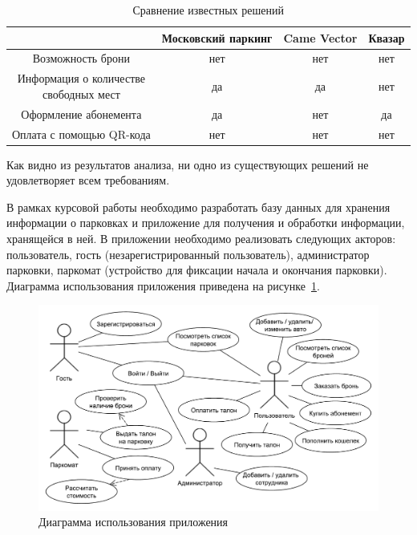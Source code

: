 \renewcommand{\thetable}{\thesubsection.\arabic{table}}
\begin{table}[H]
	\begin{center}
		\begin{center}
			\caption{\label{tab:existing_decision}Сравнение известных решений}
		\end{center}
		\begin{tabular}{|c|c|c|c|}
			\hline 
			~ & Московский паркинг & Came Vector & Квазар \\ \hline
        Возможность брони & нет & нет & нет \\ \hline
        \specialcell{Информация о количестве \\ свободных мест} & да & да & нет \\ \hline
        Оформление абонемента & да & нет & да \\ \hline
        Оплата с помощью QR-кода & нет & нет & нет \\ \hline
		\end{tabular}
	\end{center}
\end{table}
Как видно из результатов анализа, ни одно из существующих решений не удовлетворяет всем требованиям.

В рамках курсовой работы необходимо разработать базу данных для хранения информации о парковках и приложение для получения и обработки информации, хранящейся в ней.
В приложении необходимо реализовать следующих акторов: пользователь, гость (незарегистрированный пользователь), администратор парковки, паркомат (устройство для фиксации начала и окончания парковки).
Диаграмма использования приложения приведена на рисунке~\ref{fig:use_case}.
\renewcommand{\thefigure}{\thesubsection.\arabic{figure}}
\begin{figure}[h]
	\centering
	\includegraphics[height=0.35\textheight]{svg/use_case}
	\caption{Диаграмма использования приложения}
	\label{fig:use_case}
\end{figure}

